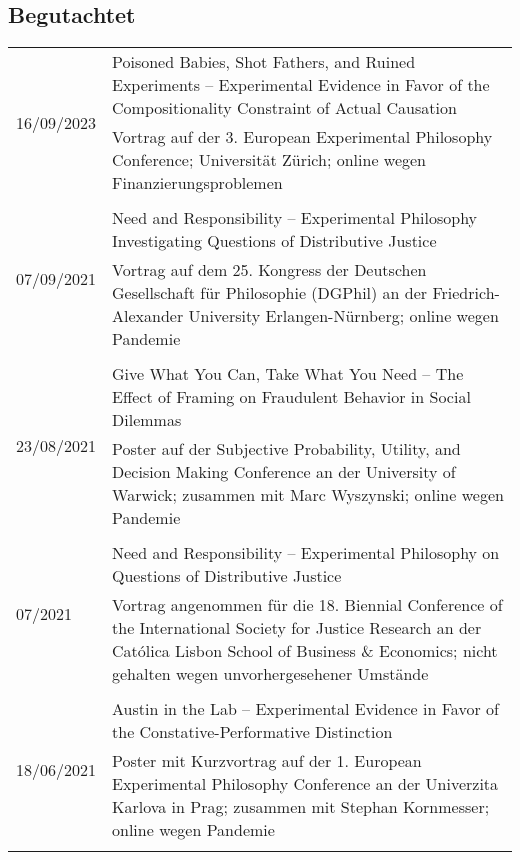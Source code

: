 \documentclass[a4paper,10pt]{article}
\begin{document}
\subsection*{Begutachtet}
\begin{longtable}{p{}p{}}

\multirow{2}{1,75cm}{\footnotesize{16/09/2023}} & Poisoned Babies, Shot Fathers, and Ruined Experiments -- Experimental Evidence in Favor of the Compositionality Constraint of Actual Causation\\
& \footnotesize{Vortrag auf der 3. European Experimental Philosophy Conference; Universität Zürich; online wegen Finanzierungsproblemen}\\
\\
\multirow{2}{1,75cm}{\footnotesize{07/09/2021}} & Need and Responsibility -- Experimental Philosophy Investigating Questions of Distributive Justice\\
& \footnotesize{Vortrag auf dem 25. Kongress der Deutschen Gesellschaft für Philosophie (DGPhil) an der Friedrich-Alexander University Erlangen-Nürnberg; online wegen Pandemie}\\
\\
\multirow{2}{1,75cm}{\footnotesize{23/08/2021}} & Give What You Can, Take What You Need -- The Effect of Framing on Fraudulent Behavior in Social Dilemmas\\
& \footnotesize{Poster auf der Subjective Probability, Utility, and Decision Making Conference an der University of Warwick; zusammen mit Marc Wyszynski; online wegen Pandemie}\\
\\
\multirow{2}{1,75cm}{\footnotesize{07/2021}} & Need and Responsibility -- Experimental Philosophy on Questions of Distributive Justice\\
& \footnotesize{Vortrag angenommen für die 18. Biennial Conference of the International Society for Justice Research an der Católica Lisbon School of Business \& Economics; nicht gehalten wegen unvorhergesehener Umstände}\\
\\
\multirow{2}{1,75cm}{\footnotesize{18/06/2021}} & Austin in the Lab -- Experimental Evidence in Favor of the Constative-Performative Distinction\\
& \footnotesize{Poster mit Kurzvortrag auf der 1. European Experimental Philosophy Conference an der Univerzita Karlova in Prag; zusammen mit Stephan Kornmesser; online wegen Pandemie}\\
\\

\end{longtable}
\end{document}
